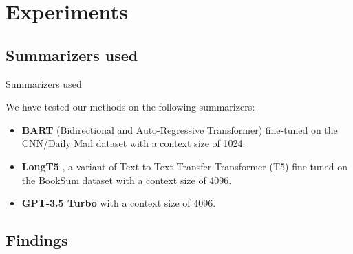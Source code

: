 \section{Experiments}


	\subsection{Summarizers used}

		\begin{frame}{Summarizers used}

			We have tested our methods on the following summarizers:

			\begin{itemize}
				\item \textbf{BART} (Bidirectional and Auto-Regressive Transformer)
				\citep{lewis-etal-2020-bart} fine-tuned on the CNN/Daily Mail dataset
				with a context size of 1024.
				\item \textbf{LongT5} \citep{guo2021longt5}, a variant of Text-to-Text
				Transfer Transformer (T5) \citep{raffel2020exploring} fine-tuned on the
				BookSum dataset with a context size of 4096.
				\item \textbf{GPT-3.5 Turbo} \citep{brown2020language} with a context
				size of 4096.
			\end{itemize}

		\end{frame}


	\subsection{Findings}

